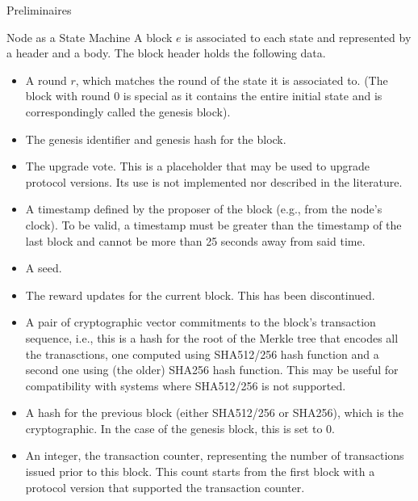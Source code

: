 \documentclass[10pt,a4paper]{article}
\begin{document}
\begin{section}{Preliminaires}
\begin{subsection}{Node as a State Machine}
A {\sf block} $e$ is associated to each state and represented by a 
header and a body. The block header holds the following data.
\begin{itemize}
    \item
    A round $r$, which matches the round of the state it is associated to. 
    (The block with round 0 is special as it contains the entire initial state
    and is correspondingly called the genesis block).
    
    \item
    The genesis identifier and genesis hash for the block.
    
    \item
    The upgrade vote. This is a placeholder that may be used to upgrade
    protocol versions. Its use is not implemented nor described in the
    literature.
    
    \item
    A timestamp defined by the proposer of the block (e.g., from the node's clock). 
    To be valid, a timestamp must be greater than the timestamp of the last block and 
    cannot be more than 25 seconds away from said time.
    
    \item
    A seed.
    
    \item
    The reward updates for the current block. This has been discontinued.

    \item
    A pair of cryptographic vector commitments to the block's transaction sequence,
    i.e., this is a hash for the root of the Merkle tree that encodes all the 
    tranasctions, one computed using SHA512/256 hash function and a second one using (the older) 
    SHA256 hash function. This may be useful for compatibility with systems where SHA512/256 
    is not supported.
    
    \item
    A hash for the previous block (either SHA512/256 or SHA256), which is the cryptographic. 
    In the case of the genesis block, this is set to 0.
    
    \item
    An integer, the transaction counter, representing the number of transactions
    issued prior to this block. This count starts from the first block with a
    protocol version that supported the transaction counter.
    

\end{itemize}
\end{subsection}
\end{section}
\end{document}
